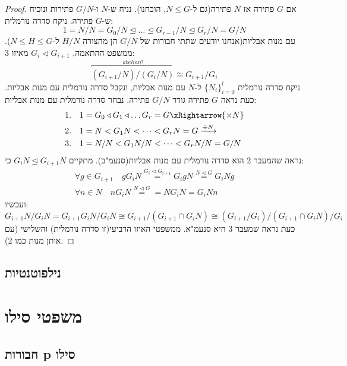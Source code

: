 \documentclass{tstextbook}
\begin{document}
\begin{proof}
אם \(G\) פתירה אז \(N\) פתירה(גם ל-\(N\leq G\), הוכחנו). נניח ש-\(N\) ו-\(G / N\) פתירות ונוכיח ש-\(G\) פתירה. ניקח סדרה נורמלית:
$$1=N / N = G_{0} / N \trianglelefteq  \dots \trianglelefteq G_{r-1} / N \trianglelefteq  G_{r} / N = G / N$$
עם מנות אבליות(אנחנו יודעים שתתי חבורות של \(G / N\) הן מהצורה \(H / N\) ל-\(N\leq H\leq G\)). ממשפט ההתאמה, \(G_{i}\triangleleft G_{i+1}\) מאיזו 3:
$$\overbracket{ (G_{i+1} / N) / (G_{i} / N) }^{ abelian! } \cong G_{i+1} / G_{i}$$
ניקח סדרה נורמלית \(\{ N_{i} \}_{i=0}^l\) ל-\(N\) עם מנות אבליות, ונקבל סדרה נורמלית עם מנות אבליות. כעת נראה \(G\) פתירה גורר \(G / N\) פתירה. נבחר סדרה
נורמלית עם מנות אבליות: 
$$\begin{aligned}1.\quad &1=G_{0}\triangleleft G_{1} \triangleleft \dots G_{r}= G \xRightarrow{\times N}\\2.\quad &1=N<G_{1}N<\dots <G_{r}N=G \xrightarrow{ \div N} \\3.\quad &1=N / N < G_{1} N / N<\dots < G_{r}N / N = G / N
\end{aligned}$$
נראה שהמעבר 2 הוא סדרה נורמלית עם מנות אבליות(סנעמ"ב). מתקיים \(G_{i}N\trianglelefteq G_{i+1}N\) כי: 
$$\begin{gathered}\forall g \in  G_{i+1}\quad  gG_{i}N\stackrel{G_{i} \triangleleft G_{i+1}}{=} G_{i}gN\stackrel{N\triangleleft G}{=} G_{i}Ng \\\forall n \in N\quad nG_{i}N \stackrel{N\triangleleft G}{=} = NG_{i}N = G_{i}Nn
\end{gathered}$$
ועכשיו:
$$G_{i+1}N / G_{i}N= G_{i+1 }G_{i}N / G_{i}N \cong G_{i+1} /\left(  G_{i+1}\cap G_{i}N \right) \cong (G_{i+1} / G_{i}) / \left( G_{i+1} \cap G_{i}N \right) / G_{i}$$
כעת נראה שמעבר 3 היא סנעמ"א. ממשפטי האיזו הרביעי(זו סדרה נורמלית) והשלישי (עם אותן מנות כמו 2).

\end{proof}
\section{נילפוטנטיות}

\chapter{משפטי סילו}

\section{חבורות p סילו}
\end{document}
